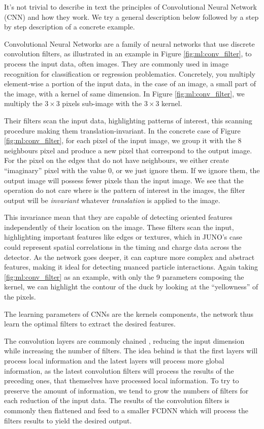 \documentclass[../main.tex]{subfiles}
\begin{document}
It's not trivial to describe in text the principles of Convolutional Neural Network (CNN) and how they work. We try a general description below followed by a step by step description of a concrete example.

Convolutional Neural Networks are a family of neural networks that use discrete convolution filters, as illustrated in an example in Figure \ref{fig:ml:conv_filter}, to process the input data, often images. They are commonly used in image recognition \cite{russakovsky_imagenet_2015} for classification or regression problematics. Concretely, you multiply element-wise a portion of the input data, in the case of an image, a small part of the image, with a kernel of same dimension. In Figure \ref{fig:ml:conv_filter}, we multiply the $3\times3$ pixels sub-image with the $3\times3$ kernel.

Their filters scan the input data, highlighting patterns of interest, this scanning procedure making them translation-invariant. In the concrete case of Figure \ref{fig:ml:conv_filter}, for each pixel of the input image, we group it with the 8 neighbours pixel and produce a new pixel that correspond to the output image. For the pixel on the edges that do not have neighbours, we either create ``imaginary'' pixel with the value 0, or we just ignore them. If we ignore them, the output image will possess fewer pixels than the input image. We see that the operation do not care where is the pattern of interest in the images, the filter output will be \textit{invariant} whatever \textit{translation} is applied to the image.

This invariance mean that they are capable of detecting oriented features independently of their location on the image.
These filters scan the input, highlighting important features like edges or textures, which in JUNO's case could represent spatial correlations in the timing and charge data across the detector. As the network goes deeper, it can capture more complex and abstract features, making it ideal for detecting nuanced particle interactions.
Again taking \ref{fig:ml:conv_filter} as an example, with only the 9 parameters composing the kernel, we can highlight the contour of the duck by looking at the ``yellowness'' of the pixels.

The learning parameters of CNNs are the kernels components, the network thus learn the optimal filters to extract the desired features.

The convolution layers are commonly chained \cite{simonyan_very_2015}, reducing the input dimension while increasing the number of filters. The idea behind is that the first layers will process local information and the latest layers will process more global information, as the latest convolution filters will process the results of the preceding ones, that themselves have processed local information. To try to preserve the amount of information, we tend to grow the numbers of filters for each reduction of the input data.
The results of the convolution filters is commonly then flattened and feed to a smaller FCDNN which will process the filters results to yield the desired output.
\end{document}
